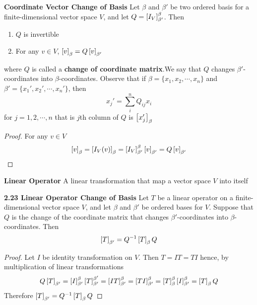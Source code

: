 \documentclass[11pt]{article}
\begin{document}


\begin{theorem*}
    \textbf{Coordinate Vector Change of Basis} Let $\beta$ and $\beta'$ be two ordered basis for a finite-dimensional vector space $V$, and let $Q = \left[ I_V \right]_{\beta'}^{\beta}$. Then 
    \begin{enumerate}
        \item $Q$ is invertible 
        \item For any $v\in V$, $\left[ v \right]_{\beta} = Q\left[ v \right]_{\beta'}$
    \end{enumerate}
    where $Q$ is called a \textbf{change of coordinate matrix}.We say that $Q$ changes $\beta'$-coordinates into $\beta$-coordinates. Observe that if $\beta = \{x_1, x_2, \cdots, x_n\}$ and $\beta' = \{x_1', x_2', \cdots, x_n'\}$, then 
    \[
        x_j' = \sum_i^n Q_{ij} x_i    
    \]
    for $j = 1,2,\cdots, n$ that is $j$th column of $Q$ is $\left[ x_j' \right]_{\beta}$
    \begin{proof}
        For any $v\in V$
        \[
            \left[ v \right]_{\beta} = \left[ I_V(v) \right]_{\beta} = \left[ I_V \right]_{\beta'}^{\beta} \left[ v \right]_{\beta'} = Q\left[ v \right]_{\beta'}
        \]
    \end{proof}
\end{theorem*}


\begin{defn*}
    \textbf{Linear Operator} A linear transformation that map a vector space $V$ into itself
\end{defn*}

\begin{theorem*}
    \textbf{2.23 Linear Operator Change of Basis} Let $T$ be a linear operator on a finite-dimensional vector space $V$, and let $\beta$ and $\beta'$ be ordered bases for $V$. Suppose that $Q$ is the change of the coordinate matrix that changes $\beta'$-coordinates into $\beta$-coordinates. Then 
    \[
        \left[ T \right]_{\beta'} = Q^{-1}\left[ T \right]_{\beta}Q    
    \]
    \begin{proof}
        Let $I$ be identity transformation on $V$. Then $T=IT=TI$ hence, by multiplication of linear transformations
        \[
            Q\left[ T \right]_{\beta'} = \left[ I \right]_{\beta'}^{\beta}\left[ T \right]_{\beta'}^{\beta'}
             = \left[ IT \right]_{\beta'}^{\beta} = \left[ TI \right]_{\beta'}^{\beta} 
             = \left[ T \right]_{\beta}^{\beta} \left[ I \right]_{\beta'}^{\beta} = \left[ T \right]_{\beta} Q
        \]
        Therefore $\left[ T \right]_{\beta'} = Q^{-1} \left[ T \right]_{\beta} Q$
    \end{proof}
\end{theorem*}
\end{document}
